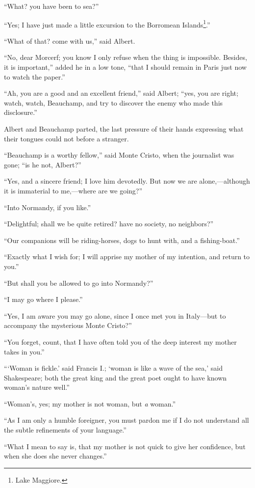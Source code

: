 “What? you have been to sea?”

“Yes; I have just made a little excursion to the Borromean Islands\footnote[18]{Lake Maggiore.}.”

“What of that? come with us,” said Albert.

“No, dear Morcerf; you know I only refuse when the thing is impossible.
Besides, it is important,” added he in a low tone, “that I should
remain in Paris just now to watch the paper.”

“Ah, you are a good and an excellent friend,” said Albert; “yes, you
are right; watch, watch, Beauchamp, and try to discover the enemy who
made this disclosure.”

Albert and Beauchamp parted, the last pressure of their hands
expressing what their tongues could not before a stranger.

“Beauchamp is a worthy fellow,” said Monte Cristo, when the journalist
was gone; “is he not, Albert?”

“Yes, and a sincere friend; I love him devotedly. But now we are
alone,—although it is immaterial to me,—where are we going?”

“Into Normandy, if you like.”

“Delightful; shall we be quite retired? have no society, no neighbors?”

“Our companions will be riding-horses, dogs to hunt with, and a
fishing-boat.”

“Exactly what I wish for; I will apprise my mother of my intention, and
return to you.”

“But shall you be allowed to go into Normandy?”

“I may go where I please.”

“Yes, I am aware you may go alone, since I once met you in Italy—but to
accompany the mysterious Monte Cristo?”

“You forget, count, that I have often told you of the deep interest my
mother takes in you.”

“‘Woman is fickle.’ said Francis I.; ‘woman is like a wave of the sea,’
said Shakespeare; both the great king and the great poet ought to have
known woman’s nature well.”

“Woman’s, yes; my mother is not woman, but \textit{a} woman.”

“As I am only a humble foreigner, you must pardon me if I do not
understand all the subtle refinements of your language.”

“What I mean to say is, that my mother is not quick to give her
confidence, but when she does she never changes.”

